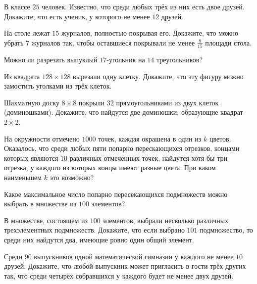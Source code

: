 \documentclass[12pt]{article}
\begin{document}
\begin{task}
В классе $25$ человек. Известно, что среди любых трёх из них есть двое друзей. Докажите, что есть ученик, у которого не менее $12$ друзей.
\end{task}

\begin{task}
На столе лежат $15$ журналов, полностью покрывая его. Докажите, что можно убрать $7$ журналов так, чтобы оставшиеся покрывали не менее $\frac{8}{15}$ площади стола.
\end{task}

\begin{task}
Можно ли разрезать выпуклый $17$-угольник на $14$ треугольников?
\end{task}

\begin{task}
Из квадрата $128 \times 128$ вырезали одну клетку. Докажите, что эту фигуру можно замостить уголками из трёх клеток.
\end{task}

\begin{task}
Шахматную доску $8 \times 8$ покрыли $32$ прямоугольниками из двух клеток (доминошками). Докажите, что найдутся две доминошки, образующие квадрат $2 \times 2$.
\end{task}

\begin{task}
На окружности отмечено $1000$ точек, каждая окрашена в один из $k$ цветов. Оказалось, что среди любых  пяти попарно перескающихся  отрезков, концами которых являются $10$ различных отмеченных точек, найдутся хотя бы три отрезка, у каждого из которых концы имеют разные цвета. При каком наименьшем $k$ это возможно?
\end{task}

\begin{task}
Какое максимальное число попарно пересекающихся подмножеств можно выбрать в множестве из $100$ элементов?
\end{task}

\begin{task}
В множестве, состоящем из $100$ элементов, выбрали несколько различных трехэлементных подмножеств. Докажите, что если выбрано $101$ подмножество, то среди них найдутся два, имеющие ровно один общий элемент.
\end{task}

\begin{task}
Среди $90$ выпускников одной математической гимназии у каждого не менее $10$ друзей. Докажите, что любой выпускник может пригласить в гости трёх других так, что среди четырёх собравшихся у каждого будет не менее двух друзей.
\end{task}
\end{document}
